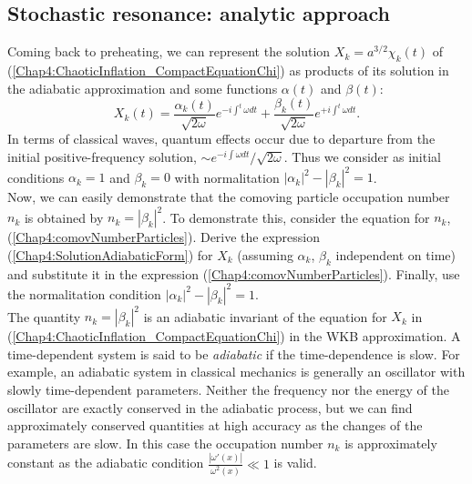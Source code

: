 \documentclass[11pt,a4paper,twoside]{book}
\begin{document}
\subsection{Stochastic resonance: analytic approach}
Coming back to preheating, we can represent the solution $ X_{k}=a^{3/2}\chi_{k}(t) $ of (\ref{Chap4:ChaoticInflation_CompactEquationChi}) as products of its solution in the adiabatic approximation and some functions $ \alpha (t) $ and $ \beta(t) $:
\begin{equation}
	\label{Chap4:SolutionAdiabaticForm}
	X_{k}(t) = \frac{\alpha_{k}(t)}{\sqrt{2\omega}}e^{-i\int^{t} \omega dt} 
	+ \frac{\beta_{k}(t)}{\sqrt{2\omega}}e^{+i\int^{t} \omega dt}.
\end{equation}
In terms of classical waves, quantum effects occur due to departure from the initial positive-frequency solution, $ \sim e^{-i \int \omega dt}/\sqrt{2\omega} $. Thus we consider as initial conditions $ \alpha_{k}=1 $ and $ \beta_{k}=0 $ with normalitation $ |\alpha_{k}|^{2} - |\beta_{k}|^{2} = 1 $.\\
Now, we can easily demonstrate that the comoving particle occupation number $ n_{k} $ is obtained by $ n_{k}=|\beta_{k}|^{2} $. To demonstrate this, consider the equation for $ n_{k} $, (\ref{Chap4:comovNumberParticles}). Derive the expression (\ref{Chap4:SolutionAdiabaticForm}) for $ X_{k} $ (assuming $ \alpha_{k} $, $\beta_{k}$ independent on time) and substitute it in the expression (\ref{Chap4:comovNumberParticles}). Finally, use the normalitation condition  $ |\alpha_{k}|^{2} - |\beta_{k}|^{2} = 1 $.\\
The quantity $ n_{k}=|\beta_{k}|^{2} $ is an adiabatic invariant of the equation for $ X_{k} $ in (\ref{Chap4:ChaoticInflation_CompactEquationChi}) in the WKB approximation. A time-dependent system  is said to be \textit{adiabatic} if the time-dependence is slow. For example, an adiabatic system in classical mechanics is generally an oscillator with slowly time-dependent parameters. Neither the frequency nor the energy of the oscillator are exactly conserved in the adiabatic process, but we can find approximately conserved quantities at high accuracy as the changes of the parameters are slow. In this case the occupation number $ n_{k} $ is approximately constant as the adiabatic condition $ \frac{|\omega'(x)|}{\omega^{2}(x)} \ll 1 $ is valid. \\
\end{document}
